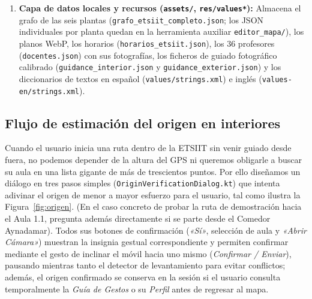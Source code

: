 \documentclass[11pt,a4paper]{article}
\begin{document}
\begin{enumerate}[leftmargin=1.8em]
    \item \textbf{Capa de datos locales y recursos (\texttt{assets/}, \texttt{res/values*}):} Almacena el grafo de las seis plantas (\texttt{grafo\_etsiit\_completo.json}; los JSON individuales por planta quedan en la herramienta auxiliar \texttt{editor\_mapa/}), los planos WebP, los horarios (\texttt{horarios\_etsiit.json}), los 36 profesores (\texttt{docentes.json}) con sus fotografías, los ficheros de guiado fotográfico calibrado (\texttt{guidance\_interior.json} y \texttt{guidance\_exterior.json}) y los diccionarios de textos en español (\texttt{values/strings.xml}) e inglés (\texttt{values-en/strings.xml}).
\end{enumerate}

\subsection{Flujo de estimación del origen en interiores}
Cuando el usuario inicia una ruta dentro de la ETSIIT sin venir guiado desde fuera, no podemos depender de la altura del GPS ni queremos obligarle a buscar su aula en una lista gigante de más de trescientos puntos. Por ello diseñamos un diálogo en tres pasos simples (\texttt{OriginVerificationDialog.kt}) que intenta adivinar el origen de menor a mayor esfuerzo para el usuario, tal como ilustra la Figura~\ref{fig:origen}. (En el caso concreto de probar la ruta de demostración hacia el Aula 1.1, pregunta además directamente si se parte desde el Comedor Aynadamar). Todos sus botones de confirmación (\textit{«Sí»}, selección de aula y \textit{«Abrir Cámara»}) muestran la insignia gestual correspondiente y permiten confirmar mediante el gesto de inclinar el móvil hacia uno mismo (\textit{Confirmar / Enviar}), pausando mientras tanto el detector de levantamiento para evitar conflictos; además, el origen confirmado se conserva en la sesión si el usuario consulta temporalmente la \textit{Guía de Gestos} o su \textit{Perfil} antes de regresar al mapa.

\vspace{0.6cm}
\end{document}
